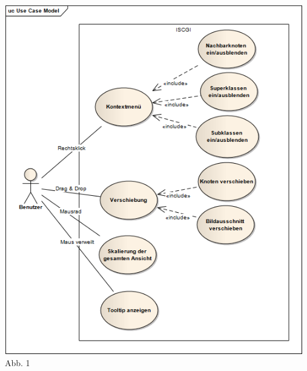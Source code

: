 \documentclass[11pt,a4paper]{article}
\begin{document}
\begin{center}
\includegraphics[width=13cm]{UseCaseModel.png}\\
\hspace*{10.7cm} Abb. 1
\end{center}\clearpage

	
\end{document}
